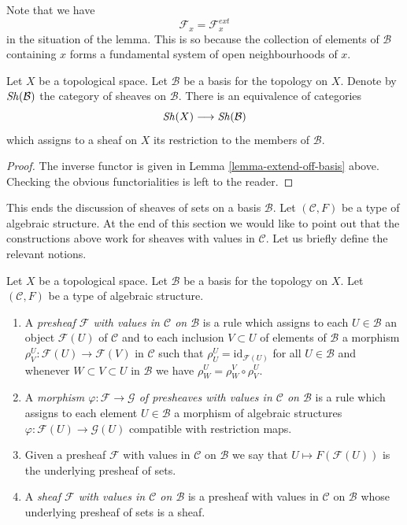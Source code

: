 \noindent
Note that we have
$$
\mathcal{F}_x = \mathcal{F}_x^{ext}
$$
in the situation of the lemma. This is so because the
collection of elements of $\mathcal{B}$ containing
$x$ forms a fundamental system of open neighbourhoods of $x$.

\begin{lemma}
\label{lemma-restrict-basis-equivalence}
Let $X$ be a topological space.
Let $\mathcal{B}$ be a basis for the topology on $X$.
Denote by $\mathop{\mathit{Sh}}\nolimits(\mathcal{B})$ the category of
sheaves on $\mathcal{B}$.
There is an equivalence of categories
$$
\mathop{\mathit{Sh}}\nolimits(X) \longrightarrow \mathop{\mathit{Sh}}\nolimits(\mathcal{B})
$$
which assigns to a sheaf on $X$ its restriction to
the members of $\mathcal{B}$.
\end{lemma}

\begin{proof}
The inverse functor is given in Lemma \ref{lemma-extend-off-basis} above.
Checking the obvious functorialities is left to the
reader.
\end{proof}

\noindent
This ends the discussion of sheaves of sets on
a basis $\mathcal{B}$. Let $(\mathcal{C}, F)$ be
a type of algebraic structure. At the end of this section
we would like to point out that the constructions
above work for sheaves with values in $\mathcal{C}$.
Let us briefly define the relevant notions.

\begin{definition}
\label{definition-sheaf-structures-basis}
Let $X$ be a topological space. Let $\mathcal{B}$ be a
basis for the topology on $X$. Let $(\mathcal{C}, F)$ be
a type of algebraic structure.
\begin{enumerate}
\item A {\it presheaf $\mathcal{F}$ with values in $\mathcal{C}$
on $\mathcal{B}$} is a rule which assigns to each
$U \in \mathcal{B}$ an object
$\mathcal{F}(U)$ of $\mathcal{C}$ and to each inclusion $V \subset U$
of elements of $\mathcal{B}$ a morphism
$\rho^U_V : \mathcal{F}(U) \to \mathcal{F}(V)$ in $\mathcal{C}$ such that
$\rho^U_U = \text{id}_{\mathcal{F}(U)}$ for all $U \in \mathcal{B}$ and
whenever $W \subset V \subset U$ in $\mathcal{B}$ we have
$\rho^U_W = \rho^V_W \circ \rho ^U_V$.
\item A {\it morphism $\varphi : \mathcal{F} \to \mathcal{G}$
of presheaves with values in $\mathcal{C}$
on $\mathcal{B}$} is a rule which assigns to each
element $U \in \mathcal{B}$ a morphism of
algebraic structures $\varphi : \mathcal{F}(U) \to \mathcal{G}(U)$
compatible with restriction maps.
\item Given a presheaf $\mathcal{F}$ with values in $\mathcal{C}$
on $\mathcal{B}$ we say that $U \mapsto F(\mathcal{F}(U))$ is the
underlying presheaf of sets.
\item A {\it sheaf $\mathcal{F}$ with values in $\mathcal{C}$
on $\mathcal{B}$} is a presheaf with values in $\mathcal{C}$
on $\mathcal{B}$ whose underlying presheaf of sets is a sheaf.
\end{enumerate}
\end{definition}

